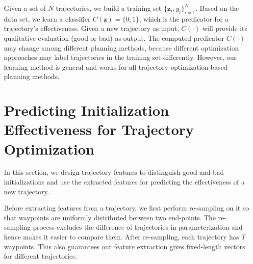 \documentclass[letterpaper, 10 pt, conference]{ieeeconf}  %
\newcommand{\fsym}{\mbox{$\mathbf z$}}
\begin{document}
Given a set of $N$ trajectories, we build a training set $\{\fsym_i, y_i\}_{i=1}^N$. Based on the data set, we learn a classifier $C(\fsym) = \{0, 1\}$, which is the predicator for a trajectory's effectiveness. Given a new trajectory as input, $C(\cdot)$ will provide its qualitative evaluation (good or bad) as output. The computed predicator $C(\cdot)$ may change among different planning methods, because different optimization approaches may label trajectories in the training set differently. However, our learning method is general and works for all trajectory optimization based planning methods.


\section{Predicting Initialization Effectiveness for Trajectory Optimization}
\label{sec:predict}

In this section, we design trajectory features to distinguish good and bad initializations and use the extracted features for predicting the effectiveness of a new trajectory.

Before extracting features from a trajectory, we first perform re-sampling on it so that waypoints are uniformly distributed between two end-points.
The re-sampling process excludes the difference of trajectories in parameterization and hence makes it easier to compare them. After re-sampling, each trajectory has $T$ waypoints. This also guarantees our feature extraction gives fixed-length vectors for different trajectories.
\end{document}
